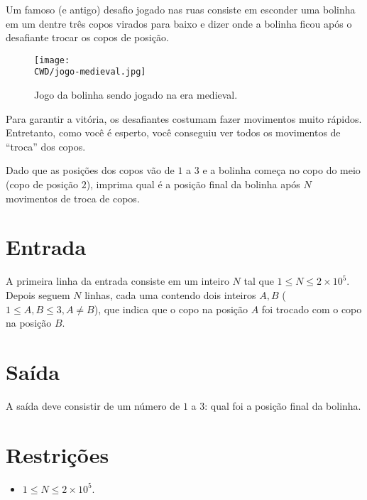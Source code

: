 %

Um famoso (e antigo) desafio jogado nas ruas consiste em esconder uma bolinha em um dentre três copos virados para baixo e dizer onde a bolinha ficou após o desafiante trocar os copos de posição.

\begin{figure}[H]
  \centering
  \texttt{[image: \\CWD/jogo-medieval.jpg]}
  \caption{Jogo da bolinha sendo jogado na era medieval.}
\end{figure}

Para garantir a vitória, os desafiantes costumam fazer movimentos muito rápidos. Entretanto, como você é esperto, você conseguiu ver todos os movimentos de ``troca'' dos copos. 

Dado que as posições dos copos vão de $1$ a $3$ e a bolinha começa no copo do meio (copo de posição $2$), imprima qual é a posição final da bolinha após $N$ movimentos de troca de copos.


%
%

\section*{Entrada}

A primeira linha da entrada consiste em um inteiro $N$ tal que $1 \leq N \leq 2\times10^5$. Depois seguem $N$ linhas, cada uma contendo dois inteiros $A, B$ ($1 \leq A, B \leq 3, A \neq B$), que indica que o copo na posição $A$ foi trocado com o copo na posição $B$.


%
%

\section*{Saída}

A saída deve consistir de um número de $1$ a $3$: qual foi a posição final da bolinha.

\section*{Restrições}

\begin{itemize}
\item $1 \leq N \leq 2\times 10^5$.
\end{itemize}


\exemplo
